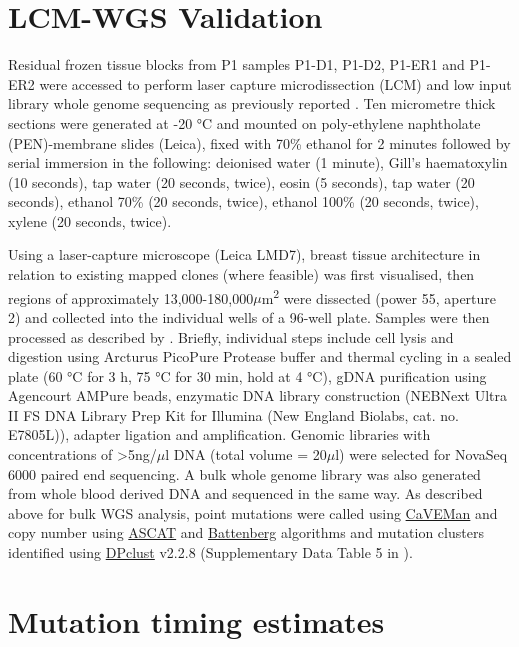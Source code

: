 \section{\acs{LCM}-\acs{WGS} Validation}
\label{sec:protocol-suppl-lcm-wgs}

Residual frozen tissue blocks from P1 samples P1-D1, P1-D2, P1-ER1 and P1-ER2 were accessed to perform laser capture microdissection (LCM) and low input library whole genome sequencing as previously reported \parencite{Ellis2021-du}. Ten micrometre thick sections were generated at -20 °C and mounted on poly-ethylene naphtholate (PEN)-membrane slides (Leica), fixed with 70\% ethanol for 2 minutes followed by serial immersion in the following: deionised water (1 minute), Gill’s haematoxylin (10 seconds), tap water (20 seconds, twice), eosin (5 seconds), tap water (20 seconds), ethanol 70\% (20 seconds, twice), ethanol 100\% (20 seconds, twice), xylene (20 seconds, twice). 

Using a laser-capture microscope (Leica LMD7), breast tissue architecture in relation to existing mapped clones (where feasible) was first visualised, then regions of approximately 13,000-180,000$\mu$m\textsuperscript{2} were dissected (power 55, aperture 2) and collected into the individual wells of a 96-well plate. Samples were then processed as described by \textcite{Ellis2021-du}. Briefly, individual steps include cell lysis and digestion using Arcturus PicoPure Protease buffer and thermal cycling in a sealed plate (60 °C for 3 h, 75 °C for 30 min, hold at 4 °C), gDNA purification using Agencourt AMPure beads, enzymatic DNA library construction (NEBNext Ultra II FS DNA Library Prep Kit for Illumina (New England Biolabs, cat. no. E7805L)), adapter ligation and amplification. Genomic libraries with concentrations of >5ng/$\mu$l DNA (total volume = 20$\mu$l) were selected for NovaSeq 6000 paired end sequencing. A bulk whole genome library was also generated from whole blood derived DNA and sequenced in the same way. As described above for bulk \ac{WGS} analysis, point mutations were called using \href{http://cancerit.github.io/CaVEMan/}{CaVEMan} and copy number using \href{https://github.com/VanLoo-lab/ascat}{ASCAT} and \href{https://github.com/cancerit/}{Battenberg} algorithms and mutation clusters identified using \href{https://github.com/Wedge-
Oxford/dpclust}{DPclust} v2.2.8 (Supplementary Data Table 5 in \textcite{Lomakin2022-ks}). 

\section{Mutation timing estimates}
\label{sec:protocol-suppl-timing}

